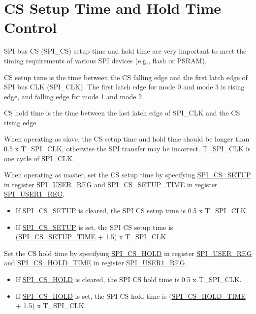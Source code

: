 \documentclass[main\_\_EN.tex]{subfiles}
\begin{document}
\section{CS Setup Time and Hold Time Control}\label{sec:gp-spi2-cs-timing}

SPI bus CS (SPI\_CS) setup time and hold time are very important to meet the timing requirements of various SPI devices (e.g., flash or PSRAM). 

CS setup time is the time between the CS falling edge and the first latch edge of SPI bus CLK (SPI\_CLK). The first latch edge for mode 0 and mode 3 is rising edge, and falling edge for mode 1 and mode 2. 

CS hold time is the time between the last latch edge of SPI\_CLK and the CS rising edge.

When operating as slave, the CS setup time and hold time should be longer than 0.5 x T\_SPI\_CLK, otherwise the SPI transfer may be incorrect. T\_SPI\_CLK is one cycle of SPI\_CLK.

When operating as master, set the CS setup time by specifying \hyperref[fielddesc:SPICSSETUP]{SPI\_CS\_SETUP} in register \hyperref[regdesc:SPIUSERREG]{SPI\_USER\_REG} and \hyperref[fielddesc:SPICSSETUPTIME]{SPI\_CS\_SETUP\_TIME} in register \hyperref[regdesc:SPIUSER1REG]{SPI\_USER1\_REG}. 
    \begin{itemize}
        \item If \hyperref[fielddesc:SPICSSETUP]{SPI\_CS\_SETUP} is cleared, the SPI CS setup time is 0.5 x T\_SPI\_CLK.
        \item If \hyperref[fielddesc:SPICSSETUP]{SPI\_CS\_SETUP} is set, the SPI CS setup time is (\hyperref[fielddesc:SPICSSETUPTIME]{SPI\_CS\_SETUP\_TIME} + 1.5) x T\_SPI\_CLK.
    \end{itemize}
        
Set the CS hold time by specifying \hyperref[fielddesc:SPICSHOLD]{SPI\_CS\_HOLD} in register \hyperref[regdesc:SPIUSERREG]{SPI\_USER\_REG} and \hyperref[fielddesc:SPICSHOLDTIME]{SPI\_CS\_HOLD\_TIME} in register \hyperref[regdesc:SPIUSER1REG]{SPI\_USER1\_REG}.
    \begin{itemize}
        \item If \hyperref[fielddesc:SPICSHOLD]{SPI\_CS\_HOLD} is cleared, the SPI CS hold time is 0.5 x T\_SPI\_CLK.
        \item If \hyperref[fielddesc:SPICSHOLD]{SPI\_CS\_HOLD} is set, the SPI CS hold time is (\hyperref[fielddesc:SPICSHOLDTIME]{SPI\_CS\_HOLD\_TIME} + 1.5) x T\_SPI\_CLK.
    \end{itemize}
\end{document}
